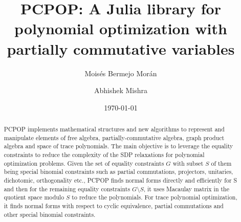 \documentclass[11pt]{scrartcl}
\title{\Large PCPOP: A Julia library for polynomial optimization with partially commutative variables}
\author[2]{Moisés Bermejo Morán}
\author[1]{Abhishek Mishra}
\affil[1]{\large Laboratoire d'Information Quantique, Université libre de Bruxelles, Belgium}
\affil[2]{\large Bilkent University, Türkiye}
\date{\today}
\begin{document}
\maketitle

\begin{abstract}
PCPOP implements mathematical structures and new algorithms to represent and manipulate elements of free algebra, partially-commutative algebra, graph product algebra and space of trace polynomials. The main objective is to leverage the equality constraints to reduce the complexity of the SDP relaxations for polynomial optimization problems. Given the set of equality constraints $G$ with subset $S$ of them being special binomial constraints such as partial commutations, projectors, unitaries, dichotomic, orthogonality etc., PCPOP finds normal forms directly and efficiently for S and then for the remaining equality constraints $G \setminus S$, it uses Macaulay matrix in the quotient space modulo $S$ to reduce the polynomials. For trace polynomial optimization, it finds normal forms with respect to cyclic equivalence, partial commutations and other special binomial constraints. 
\end{abstract}













\printbibliography
\end{document}
